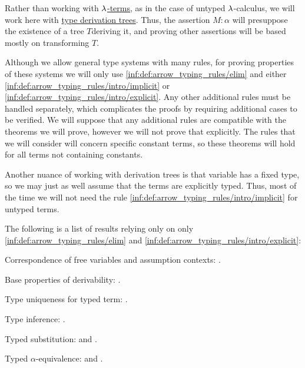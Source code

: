 \begin{remark}\label{rem:arrow_typing_rules_only}
  Rather than working with \hyperref[def:lambda_term]{\( \mathrm{\lambda} \)-terms}, as in the case of untyped \( \mathrm{\lambda} \)-calculus, we will work here with \hyperref[def:type_derivation_tree]{type derivation trees}. Thus, the assertion \( M: \alpha \) will presuppose the existence of a tree \( T \)deriving it, and proving other assertions will be based mostly on transforming \( T \).

  Although we allow general type systems with many rules, for proving properties of these systems we will only use \ref{inf:def:arrow_typing_rules/elim} and either \ref{inf:def:arrow_typing_rules/intro/implicit} or \ref{inf:def:arrow_typing_rules/intro/explicit}. Any other additional rules must be handled separately, which complicates the proofs by requiring additional cases to be verified. We will suppose that any additional rules are compatible with the theorems we will prove, however we will not prove that explicitly. The rules that we will consider will concern specific constant terms, so these theorems will hold for all terms not containing constants.

  Another nuance of working with derivation trees is that variable has a fixed type, so we may just as well assume that the terms are explicitly typed. Thus, most of the time we will not need the rule \ref{inf:def:arrow_typing_rules/intro/implicit} for untyped terms.

  The following is a list of results relying only on only \ref{inf:def:arrow_typing_rules/elim} and \ref{inf:def:arrow_typing_rules/intro/explicit}:
  \begin{thmenum}
     Correspondence of free variables and assumption contexts: .

     Base properties of derivability: .

     Type uniqueness for typed term: .

     Type inference: .

     Typed substitution:  and .

     Typed \( \alpha \)-equivalence:  and .
  \end{thmenum}
\end{remark}

